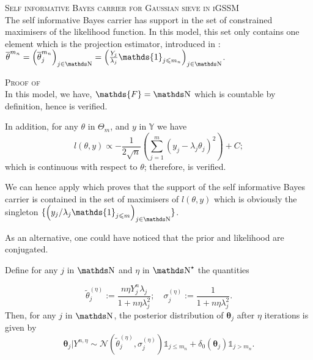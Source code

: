 \begin{thm}{\textsc{Self informative Bayes carrier for Gaussian sieve in iGSSM} \\}\label{THM_BAYES_GAUSS_SELFINFORM}
The self informative Bayes carrier has support in the set of constrained maximisers of the likelihood function.
In this model, this set only contains one element which is the projection estimator, introduced in :
$\overline{\theta}^{m_{n}} = \left(\overline{\theta}^{m_{n}}_{j}\right)_{j \in \N} = \left(\frac{Y_{j}}{\lambda_{j}} \mathds{1}_{j \leq m_{n}}\right)_{j \in \N}$.
\end{thm}

\begin{pro}{\textsc{Proof of } \\}\label{PRO_BAYES_GAUSS_SELFINFORM}
In this model, we have, $\mathds{F} = \N$ which is countable by definition, hence  is verified.

In addition, for any $\theta$ in $\Theta_{m}$, and $y$ in $\mathds{Y}$ we have
\[l(\theta, y) \propto -\frac{1}{2 \sqrt{n}}\left(\sum\limits_{j = 1}^{m} \left(y_{j} - \lambda_{j} \theta_{j}\right)^{2}\right) + C;\]
which is continuous with respect to $\theta$; therefore,  is verified.

\medskip

We can hence apply  which proves that the support of the self informative Bayes carrier is contained in the set of maximisers of $l(\theta, y)$ which is obviously the singleton $\{\left(y_{j}/\lambda_{j} \mathds{1}_{j \leq m}\right)_{j \in \N}\}$.
\qedsymbol
\end{pro}

As an alternative, one could have noticed that the prior and likelihood are conjugated.

Define for any $j$ in $\N$ and $\eta$ in $\N^{\star}$ the quantities

\[\widetilde{\theta}^{(\eta)}_{j} := \frac{n \eta Y^{n}_{j} \lambda_{j}}{1 + n \eta \lambda_{j}^{2}}; \quad \sigma^{(\eta)}_{j} := \frac{1}{1 + n \eta \lambda_{j}^{2}}.\]
Then, for any $j$ in $\N$, the posterior distribution of $\boldsymbol{\theta}_{j}$ after $\eta$ iterations is given by
\[\boldsymbol{\theta}_{j} \vert Y^{n, \eta} \sim \mathcal{N}(\widetilde{\theta}^{(\eta)}_{j}, \sigma^{(\eta)}_{j}) \mathds{1}_{j \leq m_{n}} + \delta_{0}(\boldsymbol{\theta}_{j}) \mathds{1}_{j > m_{n}}.\]

